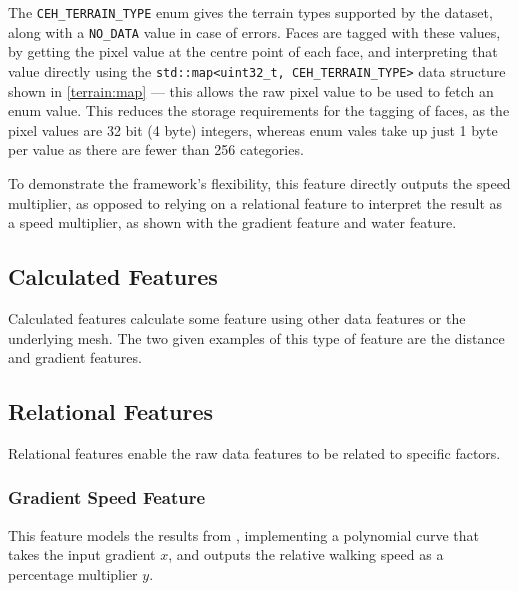 \documentclass[12pt]{article}
\begin{document}
The \texttt{CEH\_TERRAIN\_TYPE} enum gives the terrain types supported by the dataset, along with a \texttt{NO\_DATA} value in case of errors. Faces are tagged with these values, by getting the pixel value at the centre point of each face, and interpreting that value directly using the \texttt{std::map<uint32\_t, CEH\_TERRAIN\_TYPE>} data structure shown in \autoref{terrain:map} --- this allows the raw pixel value to be used to fetch an enum value. This reduces the storage requirements for the tagging of faces, as the pixel values are 32 bit (4 byte) integers, whereas enum vales take up just 1 byte per value as there are fewer than 256 categories.

To demonstrate the framework's flexibility, this feature directly outputs the speed multiplier, as opposed to relying on a relational feature to interpret the result as a speed multiplier, as shown with the gradient feature and water feature.

\subsection{Calculated Features}

Calculated features calculate some feature using other data features or the underlying mesh. The two given examples of this type of feature are the distance and gradient features.

\subsection{Relational Features}

Relational features enable the raw data features to be related to specific factors.

\subsubsection{Gradient Speed Feature}

This feature models the results from \textcite{horiuchi2015comparisons}, implementing a polynomial curve that takes the input gradient $x$, and outputs the relative walking speed as a percentage multiplier $y$.
\end{document}
